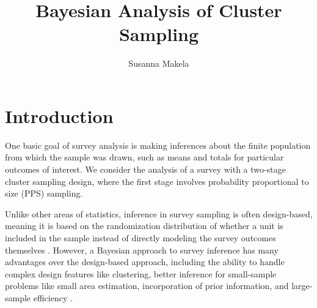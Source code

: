 \documentclass[12pt,a4paper]{article}
\author{Susanna Makela}
\title{Bayesian Analysis of Cluster Sampling}
\begin{document}
\maketitle
\doublespacing

\section*{Introduction}
One basic goal of survey analysis is making inferences about the finite population from which the sample was drawn, such as means and totals for particular outcomes of interest. We consider the analysis of a survey with a two-stage cluster sampling design, where the first stage involves probability proportional to size (PPS) sampling.

Unlike other areas of statistics, inference in survey sampling is often design-based, meaning it is based on the randomization distribution of whether a unit is included in the sample instead of directly modeling the survey outcomes themselves \citep{little2004}. However, a Bayesian approach to survey inference has many advantages over the design-based approach, including the ability to handle complex design features like clustering, better inference for small-sample problems like small area estimation, incorporation of prior information, and large-sample efficiency \citep{little2004}.
\end{document}
